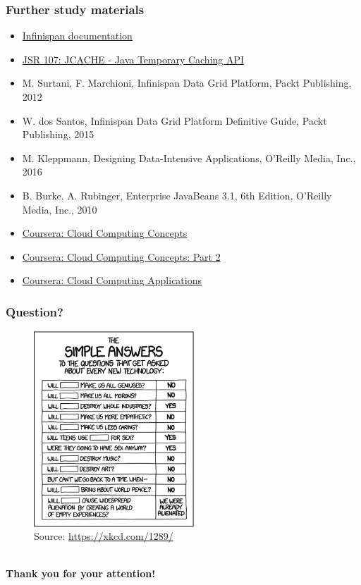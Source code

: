 \documentclass[10pt,utf8]{beamer}
\begin{document}
\begin{frame}
	\frametitle{Further study materials}
	\begin{itemize}
		\item \color{blue}\href{http://infinispan.org/documentation/}{Infinispan documentation}
		\item \href{https://jcp.org/en/jsr/detail?id=107}{JSR 107: JCACHE - Java Temporary Caching API}\color{black}
		\item M. Surtani, F. Marchioni, Infinispan Data Grid Platform,  Packt Publishing, 2012
		\item W. dos Santos, Infinispan Data Grid Platform Definitive Guide, Packt Publishing, 2015
		\item M. Kleppmann, Designing Data-Intensive Applications, O'Reilly Media, Inc., 2016
		\vspace{0.5cm}
		\item  B. Burke, A. Rubinger, Enterprise JavaBeans 3.1, 6th Edition,  O'Reilly Media, Inc., 2010
		\vspace{0.5cm}
		\color{blue}
		\item \href{https://www.coursera.org/course/cloudcomputing}{Coursera: Cloud Computing Concepts}
		\item \href{https://www.coursera.org/course/cloudcomputing2}{Coursera: Cloud Computing Concepts: Part 2}
		\item \href{https://www.coursera.org/course/cloudapplications}{Coursera: Cloud Computing Applications}
	\end{itemize}
\end{frame}

\begin{frame}
	\frametitle{Question?}
	\begin{figure}
		\centering
		\includegraphics[width=6cm]{./img/simple_answers.eps}
		\caption{\tiny{Source: \url{https://xkcd.com/1289/}}}
	\end{figure}
\end{frame}

\begin{frame}
	\centering
	\huge{} \\
	\vspace{1cm}
	\huge{\textbf{Thank you for your attention!}} \\
	\vspace{1cm}
\end{frame}
\end{document}
